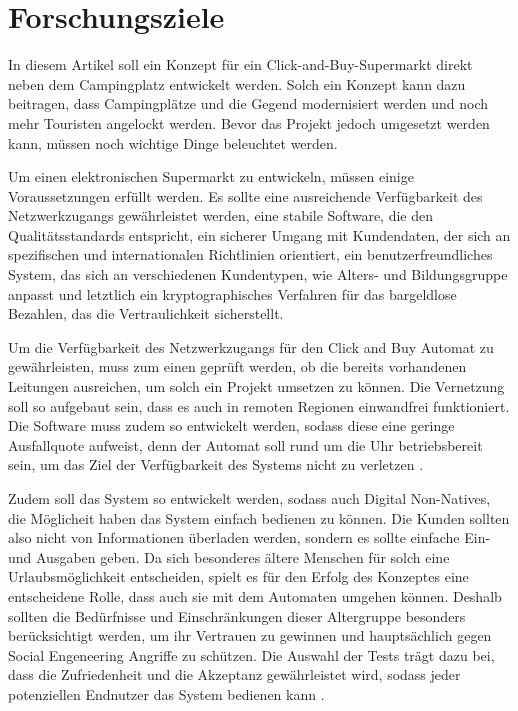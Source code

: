\section{Forschungsziele}


In diesem Artikel soll ein Konzept für ein Click-and-Buy-Supermarkt direkt neben dem Campingplatz 
entwickelt werden. Solch ein Konzept kann dazu beitragen, dass Campingplätze und die Gegend
modernisiert werden und noch mehr Touristen angelockt werden. Bevor das Projekt jedoch umgesetzt 
werden kann, müssen noch wichtige Dinge beleuchtet werden. 


Um einen elektronischen Supermarkt zu entwickeln, müssen einige Voraussetzungen erfüllt werden.
Es sollte eine ausreichende Verfügbarkeit des Netzwerkzugangs gewährleistet werden, eine stabile 
Software, die den Qualitätsstandards entspricht, ein sicherer Umgang mit Kundendaten, der sich an 
spezifischen und internationalen Richtlinien orientiert, ein benutzerfreundliches System, das sich an 
verschiedenen Kundentypen, wie Alters- und Bildungsgruppe anpasst und letztlich ein kryptographisches
Verfahren für das bargeldlose Bezahlen, das die Vertraulichkeit sicherstellt.


Um die Verfügbarkeit des Netzwerkzugangs für den Click and Buy Automat zu gewährleisten, muss zum einen 
geprüft werden, ob die bereits vorhandenen Leitungen ausreichen, um solch ein Projekt umsetzen zu können.
Die Vernetzung soll so aufgebaut sein, dass es auch in remoten Regionen einwandfrei funktioniert. 
Die Software muss zudem so entwickelt werden, sodass diese eine geringe Ausfallquote aufweist, 
denn der Automat soll rund um die Uhr betriebsbereit sein, um das Ziel der Verfügbarkeit des
 Systems nicht zu verletzen \cite{refbook:SWIS}.


Zudem soll das System so entwickelt werden, sodass auch Digital Non-Natives, die Möglicheit
\cite{refart:QWDN} haben das System einfach bedienen zu können. Die Kunden sollten also nicht von 
Informationen überladen werden, sondern es sollte einfache Ein- und Ausgaben geben. Da sich besonderes
ältere Menschen für solch eine Urlaubsmöglichkeit entscheiden, spielt es für den Erfolg des Konzeptes 
eine entscheidene Rolle, dass auch sie mit dem Automaten umgehen können. Deshalb sollten die Bedürfnisse
und Einschränkungen dieser Altergruppe besonders berücksichtigt werden, um ihr Vertrauen zu gewinnen
\cite{refart:HLAU} und hauptsächlich gegen Social Engeneering Angriffe zu schützen. Die Auswahl der
Tests trägt dazu bei, dass die Zufriedenheit und die Akzeptanz gewährleistet wird, sodass jeder 
potenziellen Endnutzer das System bedienen kann \cite{refbook:IASE}.

